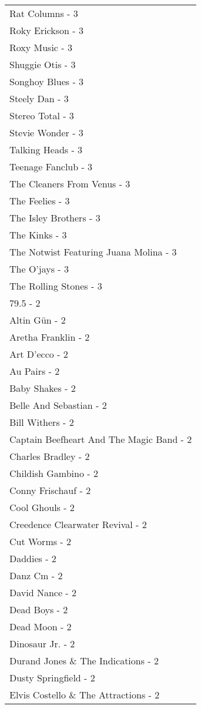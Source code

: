 \documentclass[
]{article}
\begin{document}
\begin{longtable}{l}
Rat Columns - 3 \\ 
Roky Erickson - 3 \\ 
Roxy Music - 3 \\ 
Shuggie Otis - 3 \\ 
Songhoy Blues - 3 \\ 
Steely Dan - 3 \\ 
Stereo Total - 3 \\ 
Stevie Wonder - 3 \\ 
Talking Heads - 3 \\ 
Teenage Fanclub - 3 \\ 
The Cleaners From Venus - 3 \\ 
The Feelies - 3 \\ 
The Isley Brothers - 3 \\ 
The Kinks - 3 \\ 
The Notwist Featuring Juana Molina - 3 \\ 
The O'jays - 3 \\ 
The Rolling Stones - 3 \\ 
79.5 - 2 \\ 
Altin Gün - 2 \\ 
Aretha Franklin - 2 \\ 
Art D'ecco - 2 \\ 
Au Pairs - 2 \\ 
Baby Shakes - 2 \\ 
Belle And Sebastian - 2 \\ 
Bill Withers - 2 \\ 
Captain Beefheart And The Magic Band - 2 \\ 
Charles Bradley - 2 \\ 
Childish Gambino - 2 \\ 
Conny Frischauf - 2 \\ 
Cool Ghouls - 2 \\ 
Creedence Clearwater Revival - 2 \\ 
Cut Worms - 2 \\ 
Daddies - 2 \\ 
Danz Cm - 2 \\ 
David Nance - 2 \\ 
Dead Boys - 2 \\ 
Dead Moon - 2 \\ 
Dinosaur Jr. - 2 \\ 
Durand Jones \& The Indications - 2 \\ 
Dusty Springfield - 2 \\ 
Elvis Costello \& The Attractions - 2 \\ 

\end{longtable}
\end{document}

